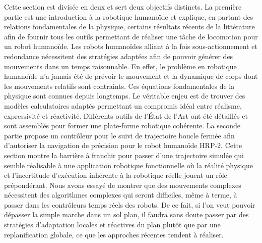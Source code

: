Cette section est divisée en deux et sert deux objectifs distincts. La
première partie est une introduction à la robotique humanoïde et
explique, en partant des relations fondamentales de la physique,
certains résultats récents de la littérature afin de fournir tous les
outils permettant de réaliser une tâche de locomotion pour un robot
humanoïde. Les robots humanoïdes alliant à la fois sous-actionnement
et redondance nécessitent des stratégies adaptées afin de pouvoir
générer des mouvements dans un temps raisonnable. En effet, le
problème en robotique humanoïde n'a jamais été de prévoir le mouvement
et la dynamique de corps dont les mouvements relatifs sont
contraints. Ces équations fondamentales de la physique sont connues
depuis longtemps. Le véritable enjeu est de trouver des modèles
calculatoires adaptés permettant un compromis idéal entre réalisme,
expressivité et réactivité. Différents outils de l'État de l'Art ont
été détaillés et sont assemblés pour former une plate-forme robotique
cohérente. La seconde partie propose un contrôleur pour le suivi de
trajectoire boucle fermée afin d'autoriser la navigation de précision
pour le robot humanoïde HRP-2. Cette section montre la
barrière à franchir pour passer d'une trajectoire simulée qui semble
réalisable à une application robotique fonctionnelle où la réalité
physique et l'incertitude d'exécution inhérente à la robotique réelle
jouent un rôle prépondérant. Nous avons essayé de montrer que des
mouvements complexes nécessitent des algorithmes complexes qui seront
difficiles, même à terme, à passer dans les contrôleurs temps réels
des robots. De ce fait, si l'on veut pouvoir dépasser la simple marche
dans un sol plan, il faudra sans doute passer par des stratégies
d'adaptation locales et réactives du plan plutôt que par une
replanification globale, ce que les approches récentes tendent à
réaliser.
